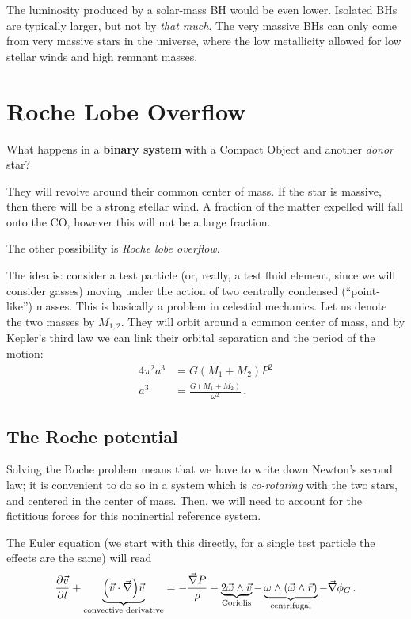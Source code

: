 \documentclass[main.tex]{subfiles}
\begin{document}
The luminosity produced by a solar-mass BH would be even lower.
Isolated BHs are typically larger, but not by \emph{that much}. The very massive BHs can only come from very massive stars in the universe, where the low metallicity allowed for low stellar winds and high remnant masses. 

\section{Roche Lobe Overflow}

What happens in a \textbf{binary system} with a Compact Object and another \emph{donor} star? 

They will revolve around their common center of mass. 
If the star is massive, then there will be a strong stellar wind.
A fraction of the matter expelled will fall onto the CO, however this will not be a large fraction. 

The other possibility is \emph{Roche lobe overflow}. 

The idea is: consider a test particle (or, really, a test fluid element, since we will consider gasses) moving under the action of two centrally condensed (``point-like'') masses. This is basically a problem in celestial mechanics.
Let us denote the two masses by \(M_{1, 2}\). They will orbit around a common center of mass, and by Kepler's third law we can link their orbital separation and the period of the motion: 
%
\begin{align}
4 \pi^2 a^3 &= G (M_1 + M_2 ) P^2 \\
a^3 &= \frac{G (M_1 + M_2 )}{\omega^2}
\,.
\end{align}

\subsection{The Roche potential}

Solving the Roche problem means that we have to write down Newton's second law; it is convenient to do so in a system which is \emph{co-rotating} with the two stars, and centered in the center of mass.
Then, we will need to account for the fictitious forces for this noninertial reference system. 

The Euler equation (we start with this directly, for a single test particle the effects are the same) will read 
%
\begin{align}
\pdv{\vec{v}}{t} + \underbrace{\qty(\vec{v} \cdot \vec{\nabla}) \vec{v} }_{\text{convective derivative}}
= - \frac{\vec{\nabla} P}{\rho } - 
\underbrace{2 \vec{\omega} \wedge \vec{v}}_{\text{Coriolis}} 
 - \underbrace{\omega \wedge \qty(\vec{\omega} \wedge \vec{r})}_{\text{centrifugal}} - \vec{\nabla} \phi_G 
\,.
\end{align}
\end{document}
